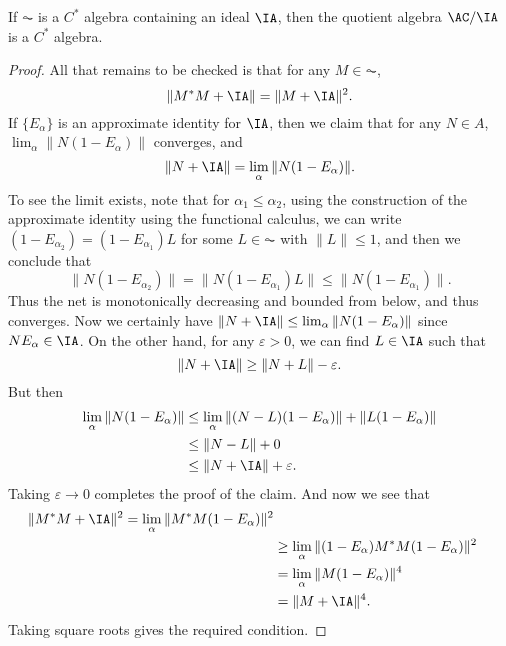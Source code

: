 \begin{theorem}
    If $\AC$ is a $C^*$ algebra containing an ideal $\IA$, then the quotient algebra $\AC / \IA$ is a $C^*$ algebra.
\end{theorem}
\begin{proof}
    All that remains to be checked is that for any $M \in \AC$,
    \[ \| M^* M + \IA \| = \| M + \IA \|^2. \]
    If $\{ E_\alpha \}$ is an approximate identity for $\IA$, then we claim that for any $N \in A$, $\lim_\alpha \| N(1 - E_\alpha) \|$ converges, and
    \[ \| N + \IA \| = \lim_\alpha \| N(1 - E_\alpha) \|. \]
    To see the limit exists, note that for $\alpha_1 \leq \alpha_2$, using the construction of the approximate identity using the functional calculus, we can write $(1 - E_{\alpha_2}) = (1 - E_{\alpha_1}) L$ for some $L \in \AC$ with $\| L \| \leq 1$, and then we conclude that
    \[ \| N(1 - E_{\alpha_2}) \| = \| N (1 - E_{\alpha_1}) L \| \leq \| N (1 - E_{\alpha_1}) \|. \]
    Thus the net is monotonically decreasing and bounded from below, and thus converges. Now we certainly have $\| N + \IA \| \leq \lim_\alpha \| N(1 - E_\alpha) \|$ since $N E_\alpha \in \IA$. On the other hand, for any $\varepsilon > 0$, we can find $L \in \IA$ such that
    \[ \| N + \IA \| \geq \| N + L \| - \varepsilon. \]
    But then
    \begin{align*}
        \lim_\alpha \| N(1 - E_\alpha) \| &\leq \lim_\alpha \| (N - L)(1 - E_\alpha) \| + \| L(1 - E_\alpha) \|\\
        &\leq  \| N - L \| + 0\\
        &\leq \| N + \IA \| + \varepsilon.
    \end{align*}
    Taking $\varepsilon \to 0$ completes the proof of the claim. And now we see that
    \begin{align*}
        \| M^* M + \IA \|^2 = \lim_\alpha \| M^* M (1 - E_\alpha) \|^2\\
        &\geq \lim_\alpha \| (1 - E_\alpha) M^* M (1 - E_\alpha) \|^2\\
        &= \lim_\alpha \| M (1 - E_\alpha) \|^4\\
        &= \| M + \IA \|^4.
    \end{align*}
    Taking square roots gives the required condition.
\end{proof}

